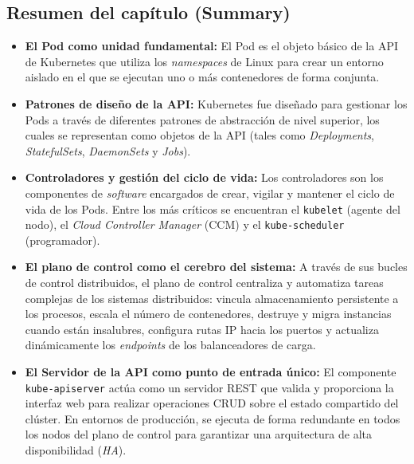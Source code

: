 \subsection{Resumen del capítulo (Summary)}

\begin{itemize}
    \item \textbf{El Pod como unidad fundamental:} El Pod es el objeto básico de la API de Kubernetes que utiliza los \textit{namespaces} de Linux para crear un entorno aislado en el que se ejecutan uno o más contenedores de forma conjunta.
    \item \textbf{Patrones de diseño de la API:} Kubernetes fue diseñado para gestionar los Pods a través de diferentes patrones de abstracción de nivel superior, los cuales se representan como objetos de la API (tales como \textit{Deployments}, \textit{StatefulSets}, \textit{DaemonSets} y \textit{Jobs}).
    \item \textbf{Controladores y gestión del ciclo de vida:} Los controladores son los componentes de \textit{software} encargados de crear, vigilar y mantener el ciclo de vida de los Pods. Entre los más críticos se encuentran el \texttt{kubelet} (agente del nodo), el \textit{Cloud Controller Manager} (CCM) y el \texttt{kube-scheduler} (programador).
    \item \textbf{El plano de control como el cerebro del sistema:} A través de sus bucles de control distribuidos, el plano de control centraliza y automatiza tareas complejas de los sistemas distribuidos: vincula almacenamiento persistente a los procesos, escala el número de contenedores, destruye y migra instancias cuando están insalubres, configura rutas IP hacia los puertos y actualiza dinámicamente los \textit{endpoints} de los balanceadores de carga.
    \item \textbf{El Servidor de la API como punto de entrada único:} El componente \texttt{kube-apiserver} actúa como un servidor REST que valida y proporciona la interfaz web para realizar operaciones CRUD sobre el estado compartido del clúster. En entornos de producción, se ejecuta de forma redundante en todos los nodos del plano de control para garantizar una arquitectura de alta disponibilidad (\textit{HA}).
\end{itemize}

